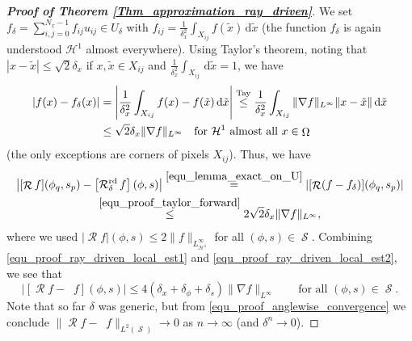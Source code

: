 \documentclass[11pt,reqno]{amsart}
\newcommand{\sumx}{\sum_{i,j=0}^{N_x-1}}
\DeclareMathOperator{\Radon}{\mathcal{R}}
\DeclareMathOperator{\RayRadon}{\mathcal{R}^\mathrm{rd}_{\delta}}
\DeclareMathOperator{\RayRadonN}{\mathcal{R}^\mathrm{rd}_{\delta^n}}
\DeclareMathOperator{\imgdom}{\Omega}
\DeclareMathOperator{\sinodom}{\mathcal{S}}
\newcommand{\dd}[1]{\,\mathrm{d}{#1}}
\numberwithin{theorem}{section}
\theoremstyle{remark}
\begin{document}
\begin{proof}[\textbf{Proof of Theorem \ref{Thm_approximation_ray_driven}}]
    We set $f_\delta=\sumx f_{ij} u_{ij}\in U_\delta$ with $f_{ij}=\frac{1}{\delta_x^2}\int_{X_{ij}} f(\tilde x) \dd {\tilde x}$ (the function $f_\delta$ is again understood  $\mathcal{H}^1$ almost everywhere).
         Using Taylor's theorem, noting that $|x-\tilde x|\leq \sqrt{2} \delta_x$ if $x,\tilde x \in X_{ij}$ and $\frac{1}{\delta_x^2}\int_{X_{ij}} \dd {\tilde x} =1$, we have 
\begin{align}\label{equ_proof_taylor_forward}
     |f(x)-f_\delta(x)| &= \left| \frac{1}{\delta_x^2}\int_{X_{ij}} f(x)- f(\tilde x) \dd {\tilde x} \right| \overset{\text{Tay}}{\leq} \frac{1}{\delta_x^2}\int_{X_{ij}} \|\nabla f\|_{L^\infty} \|x-\tilde x\| \dd {\tilde x} \notag
     \\ 
     &
     \leq \sqrt{2} \delta_x\|\nabla f\|_{L^{\infty}} \quad \text{for $\mathcal{H}^1$ almost all }x\in \imgdom
     \end{align}     
 (the only exceptions are corners of pixels $X_{ij}$). Thus, we have
    \begin{multline} \label{equ_proof_ray_driven_local_est2}
        \left|[\Radon f](\phi_q,s_p) - \left[\RayRadon f\right](\phi,s)\right| \overset{\eqref{equ_lemma_exact_on_U}}{=}\left|[\Radon (f-f_\delta)](\phi_q,s_p)\right| 
        \\
        \overset{\eqref{equ_proof_taylor_forward}}{\leq} 2 \sqrt{2} \delta_x
        \|\nabla f\|_{L^\infty} ,
    \end{multline}
    where we used $|\Radon f|(\phi,s) \leq 2 \|f\|_{L_{\mathcal{H}^1}^\infty}$ for all $(\phi,s)\in \sinodom$.
    Combining \eqref{equ_proof_ray_driven_local_est1} and \eqref{equ_proof_ray_driven_local_est2}, we see that 
	\begin{equation} \label{equ_proof_anglewise_convergence}
    \left | [\Radon f - \RayRadon f](\phi,s) \right|\leq 4 (\delta_x+\delta_\phi+\delta_s)\|\nabla f\|_{L^\infty} \qquad \text{for all }(\phi,s)\in \sinodom.
    \end{equation}	    
 Note that so far $\delta$ was generic, but from \eqref{equ_proof_anglewise_convergence} we conclude $\|\Radon f-\RayRadonN f\|_{L^2(\sinodom)} \to 0$ as $n\to \infty$ (and $\delta^n\to 0$).


\end{proof}
\end{document}
